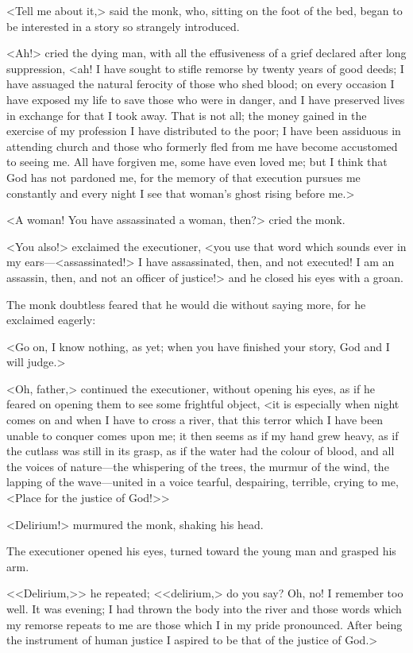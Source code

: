 <Tell me about it,> said the monk, who, sitting on the foot of the bed, began to be interested in a story so strangely introduced.

<Ah!> cried the dying man, with all the effusiveness of a grief declared after long suppression, <ah! I have sought to stifle remorse by twenty years of good deeds; I have assuaged the natural ferocity of those who shed blood; on every occasion I have exposed my life to save those who were in danger, and I have preserved lives in exchange for that I took away. That is not all; the money gained in the exercise of my profession I have distributed to the poor; I have been assiduous in attending church and those who formerly fled from me have become accustomed to seeing me. All have forgiven me, some have even loved me; but I think that God has not pardoned me, for the memory of that execution pursues me constantly and every night I see that woman's ghost rising before me.>

<A woman! You have assassinated a woman, then?> cried the monk.

<You also!> exclaimed the executioner, <you use that word which sounds ever in my ears—<assassinated!> I have assassinated, then, and not executed! I am an assassin, then, and not an officer of justice!> and he closed his eyes with a groan.

The monk doubtless feared that he would die without saying more, for he exclaimed eagerly:

<Go on, I know nothing, as yet; when you have finished your story, God and I will judge.>

<Oh, father,> continued the executioner, without opening his eyes, as if he feared on opening them to see some frightful object, <it is especially when night comes on and when I have to cross a river, that this terror which I have been unable to conquer comes upon me; it then seems as if my hand grew heavy, as if the cutlass was still in its grasp, as if the water had the colour of blood, and all the voices of nature—the whispering of the trees, the murmur of the wind, the lapping of the wave—united in a voice tearful, despairing, terrible, crying to me, <Place for the justice of God!>>

<Delirium!> murmured the monk, shaking his head.

The executioner opened his eyes, turned toward the young man and grasped his arm.

<<Delirium,>> he repeated; <<delirium,> do you say? Oh, no! I remember too well. It was evening; I had thrown the body into the river and those words which my remorse repeats to me are those which I in my pride pronounced. After being the instrument of human justice I aspired to be that of the justice of God.>

